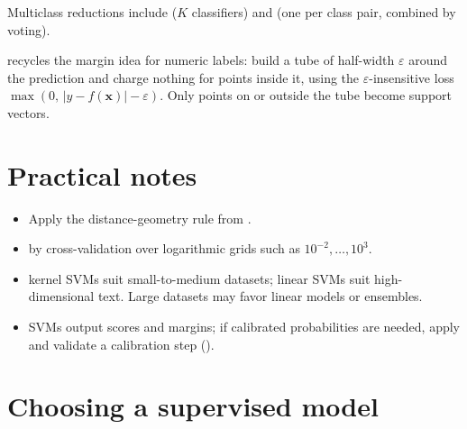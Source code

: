 Multiclass reductions include  ($K$ classifiers) and  (one per class pair, combined by voting).

 recycles the margin idea for numeric labels: build a tube of half-width $\varepsilon$ around the prediction and charge nothing for points inside it, using the $\varepsilon$-insensitive loss $\max(0,\,|y-f(\bm{x})|-\varepsilon)$. Only points on or outside the tube become support vectors.

\section{Practical notes}

\begin{itemize}
  \item {} Apply the distance-geometry rule from .
  \item {} by cross-validation over logarithmic grids such as $10^{-2},\ldots,10^{3}$.
  \item {} kernel SVMs suit small-to-medium datasets; linear SVMs suit high-dimensional text. Large datasets may favor linear models or ensembles.
  \item {} SVMs output scores and margins; if calibrated probabilities are needed, apply and validate a calibration step ().
\end{itemize}


\section{Choosing a supervised model}
\label{sec:supervised-model-choice}

